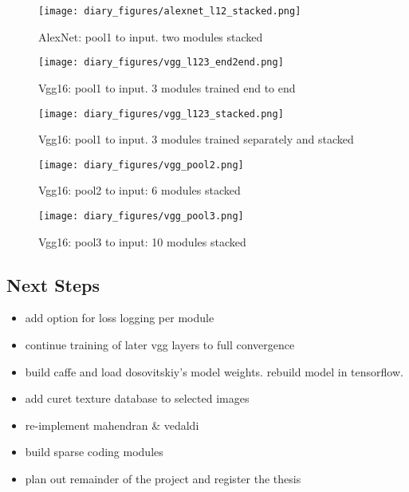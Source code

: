 \documentclass{article}
\begin{document}
\begin{figure}
    \centering
    \texttt{[image: diary\_figures/alexnet\_l12\_stacked.png]}
    \caption{AlexNet: pool1 to input. two modules stacked}
    \label{fig:may10_a_l12s}
\end{figure}

\begin{figure}
    \centering
    \texttt{[image: diary\_figures/vgg\_l123\_end2end.png]}
    \caption{Vgg16: pool1 to input. 3 modules trained end to end}
    \label{fig:may10_v_l123e2e}
\end{figure}

\begin{figure}
    \centering
    \texttt{[image: diary\_figures/vgg\_l123\_stacked.png]}
    \caption{Vgg16: pool1 to input. 3 modules trained separately and stacked}
    \label{fig:may10_v_l123s}
\end{figure}

\begin{figure}
    \centering
    \texttt{[image: diary\_figures/vgg\_pool2.png]}
    \caption{Vgg16: pool2 to input: 6 modules stacked}
    \label{fig:may10_v_pool2}
\end{figure}

\begin{figure}
    \centering
    \texttt{[image: diary\_figures/vgg\_pool3.png]}
    \caption{Vgg16: pool3 to input: 10 modules stacked}
    \label{fig:may10_v_pool3}
\end{figure}

\FloatBarrier

\subsection*{Next Steps}
\begin{itemize}
    \item add option for loss logging per module
    \item continue training of later vgg layers to full convergence
    \item build caffe and load dosovitskiy's model weights. rebuild model in tensorflow.
    \item add curet texture database to selected images
    \item re-implement mahendran \& vedaldi
    \item build sparse coding modules
    \item plan out remainder of the project and register the thesis
\end{itemize}
\end{document}
